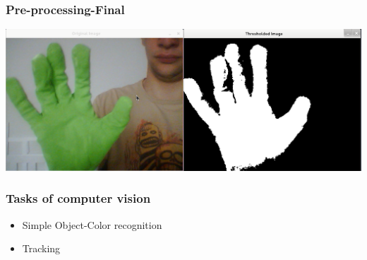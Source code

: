 \documentclass{beamer}
\begin{document}
\begin{frame}
\frametitle{Pre-processing-Final}
\begin{center}
\includegraphics[scale=0.25]{pic03.png}
\end{center}
\end{frame}
\begin{frame}
\frametitle{Tasks of computer vision}
\begin{itemize}
\item Simple Object-Color recognition
\item Tracking 
\end{itemize}
\end{frame}
\end{document}
